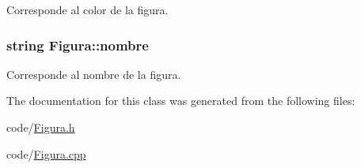 Corresponde al color de la figura. 

\hypertarget{class_figura_a5be336617ed8a4d4f28115297b38da02}{
\subsubsection[{nombre}]{\setlength{\rightskip}{0pt plus 5cm}string Figura\+::nombre}}\label{class_figura_a5be336617ed8a4d4f28115297b38da02}


Corresponde al nombre de la figura. 



The documentation for this class was generated from the following files\+:\begin{DoxyCompactItemize}
\item 
code/\hyperlink{_figura_8h}{Figura.\+h}\item 
code/\hyperlink{_figura_8cpp}{Figura.\+cpp}\end{DoxyCompactItemize}

